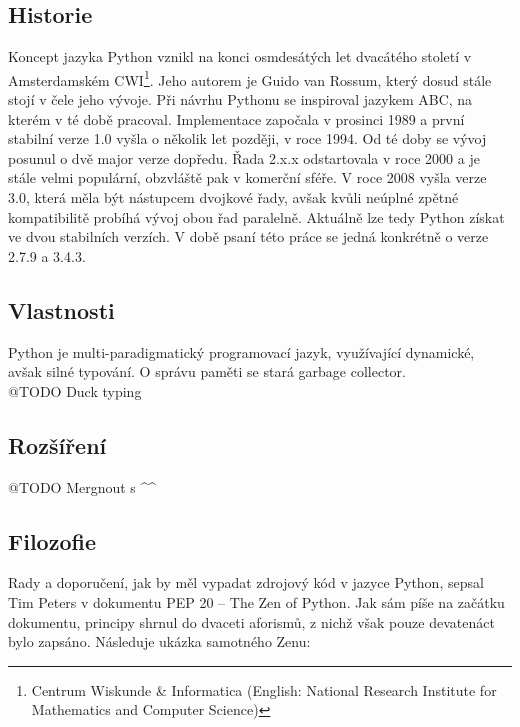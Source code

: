 \documentclass[10pt,a4paper]{article}
\begin{document}
		\subsection{Historie}
		Koncept jazyka Python vznikl na konci osmdesátých let dvacátého století v Amsterdamském CWI\footnote{Centrum Wiskunde \& Informatica (English: National Research Institute for Mathematics and Computer Science)}. Jeho autorem je Guido van Rossum, který dosud stále stojí v čele jeho vývoje. Při návrhu Pythonu se inspiroval jazykem ABC, na kterém v té době pracoval. Implementace započala v prosinci 1989 a první stabilní verze 1.0 vyšla o několik let později, v roce 1994. Od té doby se vývoj posunul o dvě major verze dopředu. Řada 2.x.x odstartovala v roce 2000 a je stále velmi populární, obzvláště pak v komerční sféře.  V roce 2008 vyšla verze 3.0, která měla být nástupcem dvojkové řady, avšak kvůli neúplné zpětné kompatibilitě probíhá vývoj obou řad paralelně. Aktuálně lze tedy Python získat ve dvou stabilních verzích. V době psaní této práce se jedná konkrétně o verze 2.7.9 a 3.4.3.

		\subsection{Vlastnosti}
		Python je multi-paradigmatický programovací jazyk, využívající dynamické, avšak silné typování. O správu paměti se stará garbage collector.
		\\@TODO Duck typing


		\subsection{Rozšíření}
		@TODO Mergnout s \textasciicircum\textasciicircum

		\subsection{Filozofie}
		Rady a doporučení, jak by měl vypadat zdrojový kód v jazyce Python, sepsal Tim Peters v dokumentu PEP 20 -- The Zen of Python. Jak sám píše na začátku dokumentu, principy shrnul do dvaceti aforismů, z nichž však pouze devatenáct bylo zapsáno. Následuje ukázka samotného Zenu:
\end{document}
